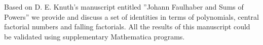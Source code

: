 Based on D. E. Knuth's manuscript entitled ''Johann Faulhaber and Sums of Powers'' we provide
and discuss a set of identities in terms of polynomials, central factorial numbers and falling factorials.
All the results of this manuscript could be validated using supplementary Mathematica programs.